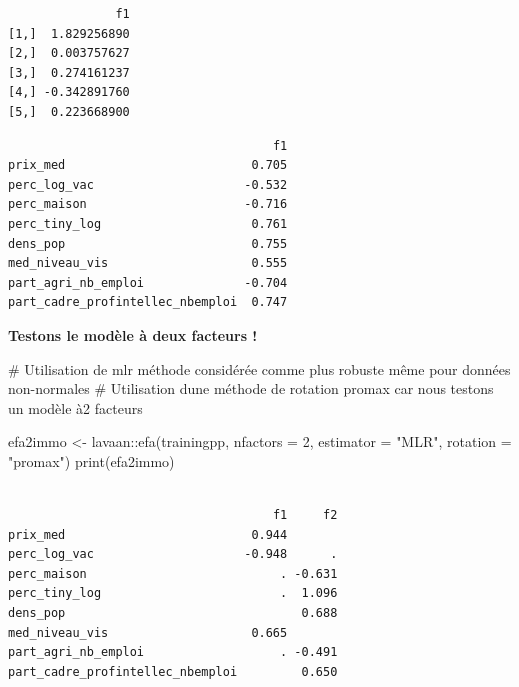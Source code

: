 \documentclass[
  french,
  11pt,
  a4paper,
]{article}
\newenvironment{Shaded}{}{}
\newcommand{\AttributeTok}[1]{\textcolor[rgb]{0.84,0.23,0.29}{#1}}
\newcommand{\CommentTok}[1]{\textcolor[rgb]{0.42,0.45,0.49}{#1}}
\newcommand{\DecValTok}[1]{\textcolor[rgb]{0.00,0.36,0.77}{#1}}
\newcommand{\FunctionTok}[1]{\textcolor[rgb]{0.44,0.26,0.76}{#1}}
\newcommand{\NormalTok}[1]{\textcolor[rgb]{0.14,0.16,0.18}{#1}}
\newcommand{\OtherTok}[1]{\textcolor[rgb]{0.44,0.26,0.76}{#1}}
\newcommand{\SpecialCharTok}[1]{\textcolor[rgb]{0.00,0.36,0.77}{#1}}
\newcommand{\StringTok}[1]{\textcolor[rgb]{0.01,0.18,0.38}{#1}}
\begin{document}
\begin{verbatim}
               f1
[1,]  1.829256890
[2,]  0.003757627
[3,]  0.274161237
[4,] -0.342891760
[5,]  0.223668900
\end{verbatim}

\begin{Shaded}
\end{Shaded}

\begin{verbatim}
                                     f1
prix_med                          0.705
perc_log_vac                     -0.532
perc_maison                      -0.716
perc_tiny_log                     0.761
dens_pop                          0.755
med_niveau_vis                    0.555
part_agri_nb_emploi              -0.704
part_cadre_profintellec_nbemploi  0.747
\end{verbatim}

\textbf{Testons le modèle à deux facteurs !}

\begin{Shaded}
\begin{Highlighting}[]
\CommentTok{\# Utilisation de mlr méthode considérée comme plus robuste même pour données non{-}normales}
\CommentTok{\# Utilisation d\textquotesingle{}une méthode de rotation promax car nous testons un modèle à2 facteurs}

\NormalTok{efa2immo }\OtherTok{\textless{}{-}}\NormalTok{ lavaan}\SpecialCharTok{::}\FunctionTok{efa}\NormalTok{(trainingpp, }\AttributeTok{nfactors =} \DecValTok{2}\NormalTok{, }\AttributeTok{estimator =} \StringTok{"MLR"}\NormalTok{, }\AttributeTok{rotation =} \StringTok{"promax"}\NormalTok{)}
\FunctionTok{print}\NormalTok{(efa2immo)}
\end{Highlighting}
\end{Shaded}

\begin{verbatim}

                                     f1     f2
prix_med                          0.944       
perc_log_vac                     -0.948      .
perc_maison                           . -0.631
perc_tiny_log                         .  1.096
dens_pop                                 0.688
med_niveau_vis                    0.665       
part_agri_nb_emploi                   . -0.491
part_cadre_profintellec_nbemploi         0.650
\end{verbatim}
\end{document}
